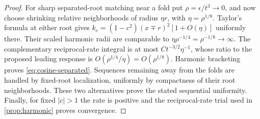 \begin{proof}
For sharp separated-root matching near a fold put
$\rho=\epsilon/t^3\to0$, and now choose shrinking relative
neighborhoods of radius $\eta r$, with $\eta=\rho^{1/8}$.
Taylor's formula at either root gives
$k_c=(1-c^2)(x\mp r)^2[1+O(\eta)]$ uniformly there.
Their scaled harmonic radii are comparable to
$\eta\rho^{-1/4}=\rho^{-1/8}\to\infty$.
The complementary reciprocal-rate integral is at most
$Ct^{-3/2}\eta^{-1}$, whose ratio to the proposed leading response
is $O(\rho^{1/4}/\eta)=O(\rho^{1/8})$.
Harmonic bracketing proves \eqref{eq:cosine-separated}.
Sequences remaining away from the folds are handled by fixed-root
localization, uniformly by compactness of their root neighborhoods.
These two alternatives prove the stated sequential uniformity.
Finally, for fixed $|c|>1$ the rate is positive and the reciprocal-rate
trial used in \cref{prop:harmonic} proves convergence.
\end{proof}

